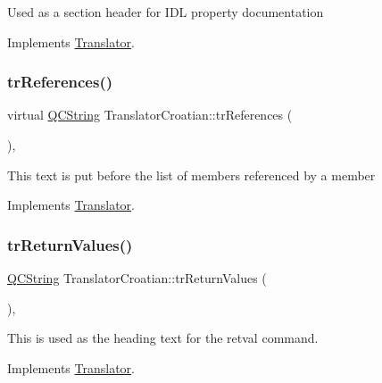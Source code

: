 Used as a section header for I\+DL property documentation 

Implements \mbox{\hyperlink{class_translator}{Translator}}.

\mbox{\label{class_translator_croatian_a1504ced62753533e0ed158a2fb441b0d}} 
\subsubsection{\texorpdfstring{trReferences()}{trReferences()}}
{\footnotesize\ttfamily virtual \mbox{\hyperlink{class_q_c_string}{Q\+C\+String}} Translator\+Croatian\+::tr\+References (\begin{DoxyParamCaption}{ }\end{DoxyParamCaption})\hspace{0.3cm}{\ttfamily [inline]}, {\ttfamily [virtual]}}

This text is put before the list of members referenced by a member 

Implements \mbox{\hyperlink{class_translator}{Translator}}.

\mbox{\label{class_translator_croatian_a37df799d71af45d282b0cb51f192eff7}} 
\subsubsection{\texorpdfstring{trReturnValues()}{trReturnValues()}}
{\footnotesize\ttfamily \mbox{\hyperlink{class_q_c_string}{Q\+C\+String}} Translator\+Croatian\+::tr\+Return\+Values (\begin{DoxyParamCaption}{ }\end{DoxyParamCaption})\hspace{0.3cm}{\ttfamily [inline]}, {\ttfamily [virtual]}}

This is used as the heading text for the retval command. 

Implements \mbox{\hyperlink{class_translator}{Translator}}.

\mbox{\label{class_translator_croatian_ac17499fef00a33227b0b863cb3794ffa}} 
